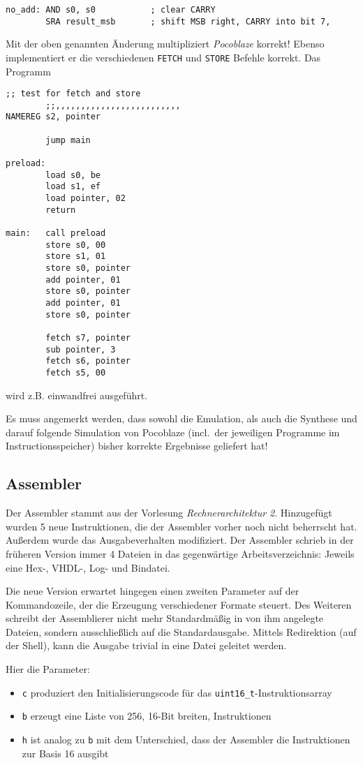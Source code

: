 \documentclass[oneside,a4paper]{article}
\def\B#1{\lstinline[style=bash]{#1}}
\def\A#1{\lstinline[style=asm]{#1}}
\def\C#1{\lstinline[style=c]{#1}}
\begin{document}
\begin{lstlisting}[style=asm]
no_add: AND s0, s0           ; clear CARRY
        SRA result_msb       ; shift MSB right, CARRY into bit 7,
\end{lstlisting}

Mit der oben genannten Änderung multipliziert \emph{Pocoblaze} korrekt!
Ebenso implementiert er die verschiedenen \A{FETCH} und
\A{STORE} Befehle korrekt. Das Programm
\begin{lstlisting}[style=asm,caption={Store und Fetch Test},label=storefetch]
        ;; test for fetch and store
        ;;,,,,,,,,,,,,,,,,,,,,,,,,,
NAMEREG s2, pointer

        jump main

preload:
        load s0, be
        load s1, ef
        load pointer, 02
        return

main:   call preload
        store s0, 00
        store s1, 01
        store s0, pointer
        add pointer, 01
        store s0, pointer
        add pointer, 01
        store s0, pointer

        fetch s7, pointer
        sub pointer, 3
        fetch s6, pointer
        fetch s5, 00
\end{lstlisting}
wird z.B. einwandfrei ausgeführt.

Es muss angemerkt werden, dass sowohl die Emulation, als auch
die Synthese und darauf folgende Simulation von Pocoblaze
(incl.\ der jeweiligen Programme im Instructionsspeicher)
bisher korrekte Ergebnisse geliefert hat!

\subsection{Assembler}
Der Assembler stammt aus der Vorlesung \emph{Rechnerarchitektur 2}.
Hinzugefügt wurden 5 neue Instruktionen, die der Assembler vorher
noch nicht beherrscht hat. Außerdem wurde das Ausgabeverhalten modifiziert.
Der Assembler schrieb in der früheren Version immer 4 Dateien
in das gegenwärtige Arbeitsverzeichnis: Jeweils eine Hex-, VHDL-, Log- und Bindatei.

Die neue Version erwartet hingegen einen zweiten Parameter auf der
Kommandozeile, der die Erzeugung verschiedener Formate steuert.
Des Weiteren schreibt der Assemblierer nicht mehr Standardmäßig in
von ihm angelegte Dateien, sondern ausschließlich auf die Standardausgabe.
Mittels Redirektion (auf der Shell), kann die Ausgabe trivial in eine
Datei geleitet werden.

Hier die Parameter:
\begin{itemize}
  \item \B{c} produziert den Initialisierungscode
    für das \C{uint16_t}-Instruktionsarray
  \item \B{b} erzeugt eine Liste von 256, 16-Bit breiten, Instruktionen
  \item \B{h} ist analog zu \B{b} mit dem Unterschied, dass der
    Assembler die Instruktionen zur Basis 16 ausgibt
\end{itemize}
\end{document}
